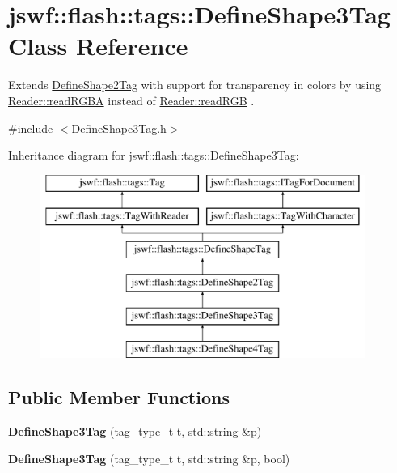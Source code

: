 \hypertarget{classjswf_1_1flash_1_1tags_1_1_define_shape3_tag}{\section{jswf\+:\+:flash\+:\+:tags\+:\+:Define\+Shape3\+Tag Class Reference}
\label{classjswf_1_1flash_1_1tags_1_1_define_shape3_tag}
}


Extends \hyperlink{classjswf_1_1flash_1_1tags_1_1_define_shape2_tag}{Define\+Shape2\+Tag} with support for transparency in colors by using \hyperlink{classjswf_1_1flash_1_1_reader_a2c89e5f540d698d4d4fc4dc983dcf81c}{Reader\+::read\+R\+G\+B\+A} instead of \hyperlink{classjswf_1_1flash_1_1_reader_abba53a3337f589e3641681c2251e4d8d}{Reader\+::read\+R\+G\+B} .  




{\ttfamily \#include $<$Define\+Shape3\+Tag.\+h$>$}

Inheritance diagram for jswf\+:\+:flash\+:\+:tags\+:\+:Define\+Shape3\+Tag\+:\begin{figure}[H]
\begin{center}
\leavevmode
\includegraphics[height=6.000000cm]{classjswf_1_1flash_1_1tags_1_1_define_shape3_tag}
\end{center}
\end{figure}
\subsection*{Public Member Functions}
\begin{DoxyCompactItemize}
\item 
\hypertarget{classjswf_1_1flash_1_1tags_1_1_define_shape3_tag_ace71312c7aba7d88c3da2c122e7f9320}{{\bfseries Define\+Shape3\+Tag} (tag\+\_\+type\+\_\+t t, std\+::string \&p)}\label{classjswf_1_1flash_1_1tags_1_1_define_shape3_tag_ace71312c7aba7d88c3da2c122e7f9320}

\item 
\hypertarget{classjswf_1_1flash_1_1tags_1_1_define_shape3_tag_aa72e1084cb0052dec2b23a228db0d063}{{\bfseries Define\+Shape3\+Tag} (tag\+\_\+type\+\_\+t t, std\+::string \&p, bool)}\label{classjswf_1_1flash_1_1tags_1_1_define_shape3_tag_aa72e1084cb0052dec2b23a228db0d063}

\end{DoxyCompactItemize}
